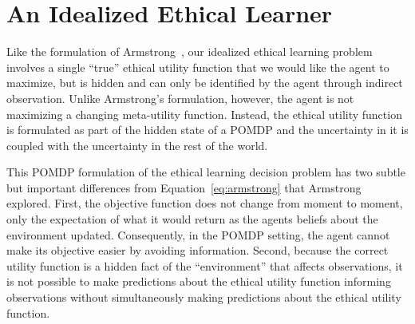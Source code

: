 \documentclass[11pt]{article}
\newcommand\davenote[1]{\textcolor{blue}{Dave: #1}}
\begin{document}

\section{An Idealized Ethical Learner}
Like the formulation of Armstrong~, our idealized ethical learning problem involves a single ``true'' ethical utility function that we would like the agent to maximize, but is hidden and can only be identified by the agent through indirect observation. Unlike Armstrong's formulation, however, the agent is not maximizing a changing meta-utility function. Instead, the ethical utility function is formulated as part of the hidden state of a POMDP and the uncertainty in it is coupled with the uncertainty in the rest of the world.

This POMDP formulation of the ethical learning decision problem has two subtle but important differences from Equation~\ref{eq:armstrong} that Armstrong explored. First, the objective function does not change from moment to moment, only the expectation of what it would return as the agents beliefs about the environment updated. Consequently, in the POMDP setting, the agent cannot make its objective easier by avoiding information. Second, because the correct utility function is a hidden fact of the ``environment'' that affects observations, it is not possible to make predictions about the ethical utility function informing observations without simultaneously making predictions about the ethical utility function.
\end{document}
